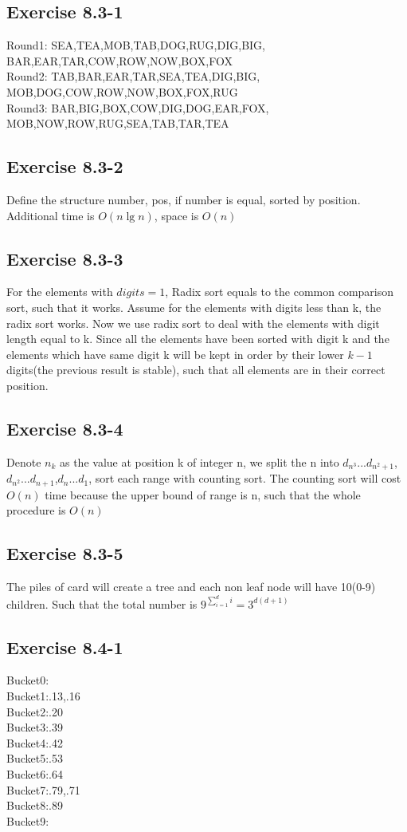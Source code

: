 \documentclass[12pt]{article}
\theoremstyle{definition}
\theoremstyle{remark}
\begin{document}
\subsection*{Exercise 8.3-1}
Round1: SEA,TEA,MOB,TAB,DOG,RUG,DIG,BIG,\\BAR,EAR,TAR,COW,ROW,NOW,BOX,FOX\\
Round2: TAB,BAR,EAR,TAR,SEA,TEA,DIG,BIG,\\MOB,DOG,COW,ROW,NOW,BOX,FOX,RUG\\
Round3: BAR,BIG,BOX,COW,DIG,DOG,EAR,FOX,\\MOB,NOW,ROW,RUG,SEA,TAB,TAR,TEA
\subsection*{Exercise 8.3-2}
Define the structure {number, pos}, if number is equal, sorted by position. Additional time is $O(n\lg n)$, space is $O(n)$
\subsection*{Exercise 8.3-3}
For the elements with $digits=1$, Radix sort equals to the common comparison sort, such that it works. Assume for the elements with digits less than k, the radix sort works. Now we use radix sort to deal with the elements with digit length equal to k. Since all the elements have been sorted with digit k and the elements which have same digit k will be kept in order by their lower $k-1$ digits(the previous result is stable), such that all elements are in their correct position.
\subsection*{Exercise 8.3-4}
Denote $n_k$ as the value at position k of integer n, we split the n into $d_{n^3}...d_{n^2+1}$,\\$d_{n^2}...d_{n+1}$,$d_{n}...d_{1}$, sort each range with counting sort. The counting sort will cost $O(n)$ time because the upper bound of range is n, such that the whole procedure is $O(n)$
\subsection*{Exercise 8.3-5}
The piles of card will create a tree and each non leaf node will have 10(0-9) children. Such that the total number is $9^{\sum_{i=1}^di}=3^{d(d+1)}$
\subsection*{Exercise 8.4-1}
Bucket0:\\
Bucket1:.13,.16\\
Bucket2:.20\\
Bucket3:.39\\
Bucket4:.42\\
Bucket5:.53\\
Bucket6:.64\\
Bucket7:.79,.71\\
Bucket8:.89\\
Bucket9:\\
\end{document}
